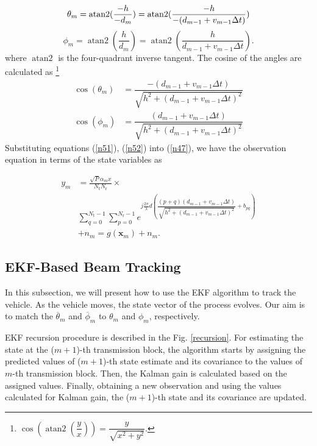 \documentclass{ieeeaccess}
\begin{document}
\begin{equation} \label{n49}
\theta_m = \operatorname{atan2}(\dfrac{-h}{-d_m}) = \operatorname{atan2}(\dfrac{-h}{-(d_{m-1} + v_{m-1}\Delta t)})\\
\end{equation}
\begin{equation} \label{n50}
\phi_m = \operatorname{atan2}(\dfrac{h}{d_m}) = \operatorname{atan2}(\dfrac{h}{d_{m-1} + v_{m-1}\Delta t}).
\end{equation}
where $\operatorname{atan2}$ is the four-quadrant inverse tangent. The cosine of the angles are calculated as
\footnote{$\operatorname{cos}(\operatorname{atan2}(\dfrac{y}{x})) = \dfrac{y}{\sqrt{x^2+y^2}}$.}
\begin{align}\label{n51}
\operatorname{cos}(\theta_m)&= \dfrac{-(d_{m-1} + v_{m-1}\Delta t)}{\sqrt{h^2+(d_{m-1} + v_{m-1}\Delta t)^2}}\\
\operatorname{cos}(\phi_m)&= \dfrac{(d_{m-1} + v_{m-1}\Delta t)}{\sqrt{h^2+(d_{m-1} + v_{m-1}\Delta t)^2}} \label{n52}
\end{align}
Substituting equations (\ref{n51}), (\ref{n52}) into (\ref{n47}), we have the observation equation in terms of the state variables as

 \begin{equation} \label{n53}
\begin{split}
y_m &=\frac{\sqrt{P}\alpha_mx}{N_\textrm{t}N_\textrm{r}}\times \\ &\sum\limits_{q=0}^{N_\textrm{t}-1} \sum\limits_{p=0}^{N_\textrm{r}-1}e^{j\frac{2\pi}{\lambda}d(\dfrac{(p+q)(d_{m-1} + v_{m-1}\Delta t)}{\sqrt{h^2+(d_{m-1} + v_{m-1}\Delta t)^2}}+b_{pq})}\\ &+ n_m = g(\boldsymbol{x}_m)+n_m.
\end{split}
\end{equation}



\subsection{EKF-Based Beam Tracking}
In this subsection, we will present how to use the EKF algorithm to track the vehicle. As the vehicle moves, the state vector of the process evolves. Our aim is to match the $\overline{\theta}_m$ and $\overline{\phi}_m$ to $\theta_m$ and $\phi_m$, respectively.

EKF recursion procedure \cite{ekf} is described in the Fig. \ref{recursion}. For estimating the state at the ($m+1$)-th transmission block, the algorithm starts by assigning the predicted values of ($m+1$)-th state estimate and its covariance to the values of $m$-th transmission block. Then, the Kalman gain is calculated based on the assigned values. Finally, obtaining a new observation and using the values calculated for Kalman gain, the ($m+1$)-th state and its covariance are updated.
\end{document}
